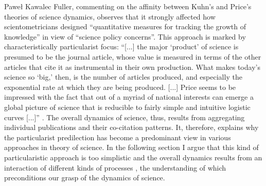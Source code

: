 \begin{artengenv}{Paweł Kawalec}
Fuller, commenting on the affinity between Kuhn's and Price's theories of science dynamics, observes that it strongly affected how scientometricians designed ``quantitative measures for tracking the growth of knowledge'' in view of ``science policy concerns''. This approach is marked by characteristically particularist focus: ``[...] the major ‘product' of science is presumed to be the journal article, whose value is measured in terms of the other articles that cite it as instrumental in their own production. What makes today's science so ‘big,' then, is the number of articles produced, and especially the exponential rate at which they are being produced. [...] Price seems to be impressed with the fact that out of a myriad of national interests can emerge a global picture of science that is reducible to fairly simple and intuitive logistic curves [...]''
\parencite[][pp.270–271]{fuller_being_1992}. %
 The overall dynamics of science, thus, results from aggregating individual publications and their co-citation patterns. It, therefore, explains why the particularist predilection has become a predominant view in various approaches in theory of science. In the following section I argue that this kind of particularistic approach is too simplistic and the overall dynamics results from an interaction of different kinds of processes 
\parencite[][]{giovagnoli_cognitive_2020}, %
 the understanding of which preconditions our grasp of the dynamics of science.


\end{artengenv}
